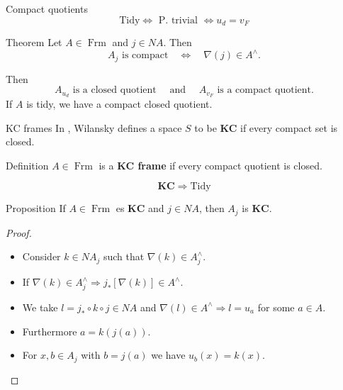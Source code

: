 \documentclass[compress,12pt]{beamer}
\DeclareMathOperator{\Frm}{Frm}
\begin{document}
\begin{frame}{Compact quotients}
  \[
  \mbox{Tidy} \iff \mbox{ P. trivial }\iff u_d=v_F
  \]

  \begin{block}{Theorem}
  Let $A\in \Frm$ and $j\in NA$. Then
  \[
    A_j \mbox{ is compact}\quad\iff\quad \nabla(j)\in A^\wedge.
  \]
  \end{block}
  Then
  \[
  A_{u_d} \mbox{ is a closed quotient}\quad \mbox{ and }\quad A_{v_F} \mbox{ is a compact quotient.}
  \]
  If $A$ is tidy, we have a compact closed quotient.

\end{frame}

\begin{frame}{KC frames}
In \cite{A.W.}, Wilansky defines a space $S$ to be \textbf{KC} if every compact set is closed. 

\begin{block}{Definition}
$A\in \Frm$ is a \textbf{KC frame} if every compact quotient is closed.
\end{block}
\[
\mathbf{KC}\Rightarrow \mbox{Tidy}
\]
\begin{block}{Proposition}
If $A\in \Frm$ es $\mathbf{KC}$ and $j\in NA$, then $A_j$ is $\mathbf{KC}$.
\end{block}
\end{frame}

\begin{frame}
\begin{proof}
\begin{itemize}
  \item Consider $k\in NA_j$ such that $\nabla(k)\in A_j^\wedge$.
  \item If $\nabla(k)\in A_j^\wedge \Rightarrow j_*[\nabla(k)]\in A^\wedge$.
  \item We take $l=j_*\circ k\circ j\in NA$ and $\nabla(l)\in A^\wedge\Rightarrow l=u_a$ for some $a\in A$.
  \item Furthermore $a=k(j(a))$.
  \item For $x, b\in A_j$ with $b=j(a)$ we have $u_b(x)=k(x)$. 
\end{itemize}
\end{proof}

\end{frame}
\end{document}
